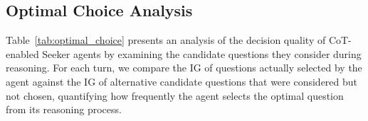 \documentclass[letterpaper]{article} %
\begin{document}
\subsection{Optimal Choice Analysis}

Table~\ref{tab:optimal_choice} presents an analysis of the decision quality of CoT-enabled Seeker agents by examining the candidate questions they consider during reasoning. For each turn, we compare the IG of questions actually selected by the agent against the IG of alternative candidate questions that were considered but not chosen, quantifying how frequently the agent selects the optimal question from its reasoning process.



\clearpage


% 
\end{document}
